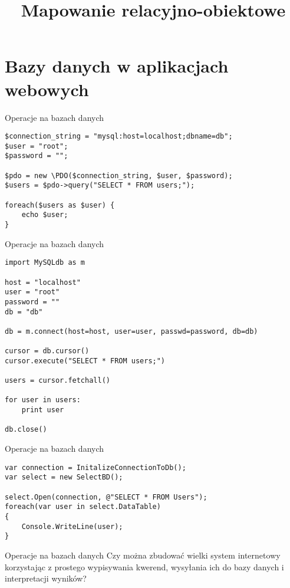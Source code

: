 

\title{Mapowanie relacyjno-obiektowe}



\section{Bazy danych w aplikacjach webowych}

\begin{frame}[fragile]{Operacje na bazach danych}
	\begin{lstlisting}	
$connection_string = "mysql:host=localhost;dbname=db";
$user = "root";
$password = "";

$pdo = new \PDO($connection_string, $user, $password);
$users = $pdo->query("SELECT * FROM users;");

foreach($users as $user) {
    echo $user;
}
	\end{lstlisting}
\end{frame}

\begin{frame}[fragile]{Operacje na bazach danych}
	\begin{lstlisting}
import MySQLdb as m

host = "localhost"
user = "root"
password = ""
db = "db"

db = m.connect(host=host, user=user, passwd=password, db=db)

cursor = db.cursor()
cursor.execute("SELECT * FROM users;")

users = cursor.fetchall()

for user in users:
    print user
    
db.close()
	\end{lstlisting}
\end{frame}

\begin{frame}[fragile]{Operacje na bazach danych}
	\begin{lstlisting}
var connection = InitalizeConnectionToDb();
var select = new SelectBD();

select.Open(connection, @"SELECT * FROM Users");
foreach(var user in select.DataTable)
{
    Console.WriteLine(user);
}

	\end{lstlisting}
\end{frame}

\begin{frame}{Operacje na bazach danych}
	Czy można zbudować wielki system internetowy korzystając z prostego wypisywania kwerend, wysyłania ich do bazy danych i interpretacji wyników?
	
	\ \\
\end{frame}

